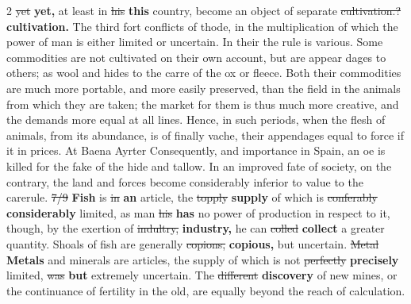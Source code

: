 \documentclass[10pt]{article}
\begin{document}
\begin{multicols}{2}
\sout{yet} \textbf{yet,} at least in \sout{his} \textbf{this} country, become an object of separate \sout{cultivation.?} \textbf{cultivation.} The third fort conflicts of thode, in the multiplication of which the power of man is either limited or uncertain. In their the rule is various. Some commodities are not cultivated on their own account, but are appear dages to others; as wool and hides to the carre of the ox or fleece. Both their commodities are much more portable, and more easily preserved, than the field in the animals from which they are taken; the market for them is thus much more creative, and the demands more equal at all lines. Hence, in such periods, when the flesh of animals, from its abundance, is of finally vache, their appendages equal to force if it in prices. At Baena Ayrter Consequently, and importance in Spain, an oe is killed for the fake of the hide and tallow. In an improved fate of society, on the contrary, the land and forces become considerably inferior to value to the carerule. \sout{7/9} \textbf{Fish} is \sout{in} \textbf{an} article, the \sout{topply} \textbf{supply} of which is \sout{conferably} \textbf{considerably} limited, as man \sout{his} \textbf{has} no power of production in respect to it, though, by the exertion of \sout{indultry,} \textbf{industry,} he can \sout{colled} \textbf{collect} a greater quantity. Shoals of fish are generally \sout{copions,} \textbf{copious,} but uncertain. \sout{Metal} \textbf{Metals} and minerals are articles, the supply of which is not \sout{perfectly} \textbf{precisely} limited, \sout{was} \textbf{but} extremely uncertain. The \sout{different} \textbf{discovery} of new mines, or the continuance of fertility in the old, are equally beyond the reach of calculation.


\end{multicols}
\end{document}
